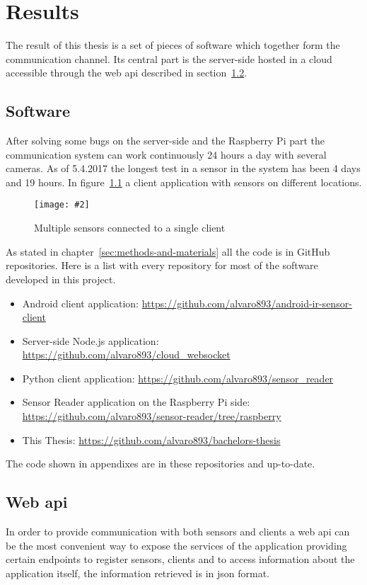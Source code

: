 \documentclass[hidelinks,11pt,a4paper,oneside,article]{memoir}
\newcommand{\putimage}[3][10] %
{
\begin{figure}[h]
	\centering
	\captionsetup{justification=centering}
	\texttt{[image: \#2]}
	\caption{#3}
	\label{fig:#2}
\end{figure}
}
\begin{document}
\clearpage\chapter{Results}\label{sec:results}
The result of this thesis is a set of pieces of software which together form the communication channel. Its central part is the server-side hosted in a cloud accessible through the web \gls{api} described in section~\ref{sec:web-api}.



\section{Software}\label{sec:software}
After solving some bugs on the server-side and the Raspberry Pi part the communication system can work continuously 24 hours a day with several cameras. As of 5.4.2017 the longest test in a sensor in the system has been 4 days and 19 hours. In figure~\ref{fig:multi-camera} a client application with sensors on different locations.

     \putimage{multi-camera}{Multiple sensors connected to a single client}

As stated in chapter~\ref{sec:methods-and-materials} all the code is in GitHub repositories. Here is a list with every repository for most of the software developed in this project.


\begin{itemize}
    \item Android client application: \url{https://github.com/alvaro893/android-ir-sensor-client}
    \item Server-side Node.js application: \url{https://github.com/alvaro893/cloud_websocket}
    \item Python client application: \url{https://github.com/alvaro893/sensor_reader}
    \item Sensor Reader application on the Raspberry Pi side: \url{https://github.com/alvaro893/sensor-reader/tree/raspberry}
    \item This Thesis: \url{https://github.com/alvaro893/bachelors-thesis}
\end{itemize}

The code shown in appendixes are in these repositories and up-to-date.


\section{Web \gls{api}} \label{sec:web-api}
In order to provide communication with both sensors and clients a web \gls{api} can be the most convenient way to expose the services of the application providing certain endpoints to register sensors, clients and to access information about the application itself, the information retrieved is in \gls{json} format.
\end{document}
